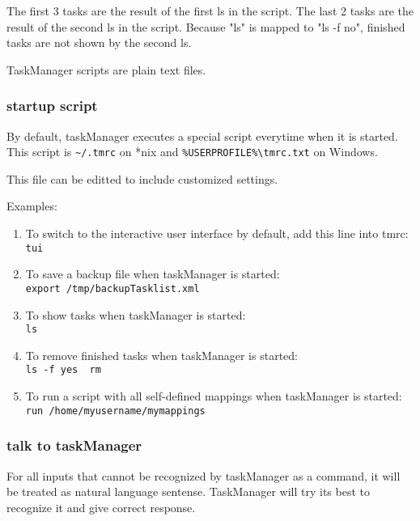 \documentclass[12pt, a4paper]{article}
\begin{document}
The first 3 tasks are the result of the first ls in the script. The last 2 tasks are the result of the second ls in the script. Because "ls" is mapped to "ls -f no", finished tasks are not shown by the second ls.

TaskManager scripts are plain text files. %

\subsubsection{startup script}

By default, taskManager executes a special script everytime when it is started. 
This script is \texttt{\~{}/.tmrc} on *nix and \texttt{\%USERPROFILE\%\textbackslash tmrc.txt} on Windows.

This file can be editted to include customized settings.

Examples:
\begin{enumerate}
\item To switch to the interactive user interface by default, add this line into tmrc:\\
  \texttt{tui}

\item To save a backup file when taskManager is started:\\
  \texttt{export /tmp/backupTasklist.xml}

\item To show tasks when taskManager is started:\\
  \texttt{ls}

\item To remove finished tasks when taskManager is started:\\
  \texttt{ls -f yes \textbar \  rm}

\item To run a script with all self-defined mappings when taskManager is started:\\
  \texttt{run /home/myusername/mymappings}
\end{enumerate}

\subsubsection{talk to taskManager}

For all inputs that cannot be recognized by taskManager as a command, it will be treated as natural language sentense. 
TaskManager will try its best to recognize it and give correct response.
\end{document}
